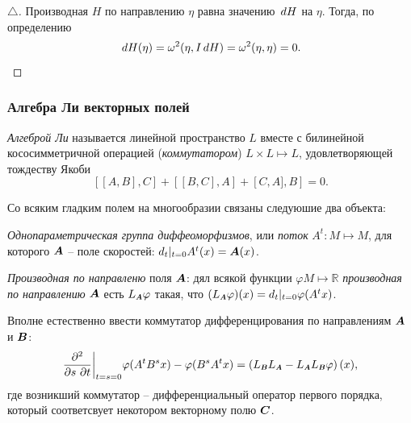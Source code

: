 \begin{proof}[$\triangle$]
Производная $H$ по направлению $\eta$ равна значению $\, d H$ на $\eta$. Тогда, по определению
\begin{equation*}
    \, d H (\eta) = \omega^2 (\eta,  I \, d H) = \omega^2 (\eta, \eta) = 0.
\end{equation*}
\end{proof}



\subsubsection*{Алгебра Ли векторных полей}


\begin{to_def}
    \textit{Алгеброй Ли} называется линейной пространство $L$ вместе с билинейной кососимметричной операцией (\textit{коммутатором}) $L \times  L \mapsto L$, удовлетворяющей тождеству Якоби
    \begin{equation*}
        \left[[A, B], C\right] + \left[[B, C], A\right] + \left[C, A], B\right] = 0.
    \end{equation*}
\end{to_def}


Со всяким гладким полем на многообразии связаны следуюшие два объекта: \vspace{-2mm}
\begin{enumerate*}
    \item \textit{Однопараметрическая группа диффеоморфизмов}, или \textit{поток} $A^t \colon  M \mapsto M$, для которого $\mbox{\boldmath $A$}$ -- поле скоростей:
    $d_t |_{t=0} A^t (x) = \mbox{\boldmath $A$}(x)$.
    \item \textit{Производная по направленю} поля $\mbox{\boldmath $A$}$: дял всякой функции $\varphi M \mapsto \mathbb{R}$ \textit{производная по направлению} $\mbox{\boldmath $A$}$ есть $L_{\smallvc{A}} \varphi $ такая, что $(L_{\smallvc{A}}\varphi )(x) = d_t |_{t=0} \varphi(A^t x)$.
\end{enumerate*}


Вполне естественно ввести коммутатор дифференцирования по направлениям $\mbox{\boldmath $A$}$ и $\mbox{\boldmath $B$}$:
\begin{equation*}
    \frac{\partial^2}{\partial s \ \partial t} \bigg|_{t=s=0} \varphi(A^t B^s x) - \varphi(B^s A^t x) = \left(
        L_{\smallvc{B}} L_{\smallvc{A}} - L_{\smallvc{A}} L_{\smallvc{B}} \varphi
    \right) (x),
\end{equation*}
где возникший коммутатор -- дифференциальный оператор первого порядка, который соответсвует некотором векторному полю $\mbox{\boldmath $C$}$.


